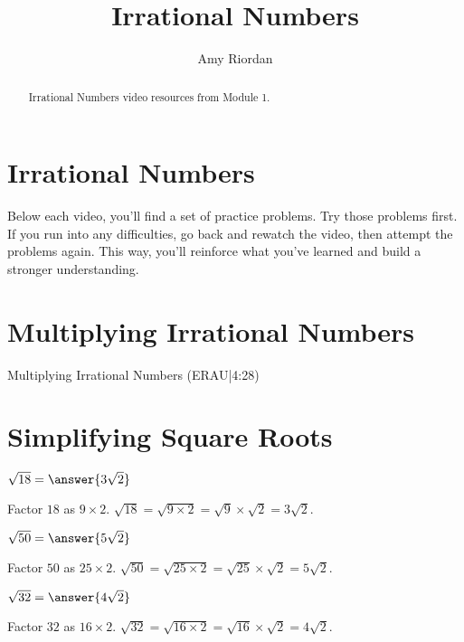 \documentclass{ximera}
\title{Irrational Numbers}
\author{Amy Riordan}
\begin{document}
\begin{abstract}
Irrational Numbers video resources from Module 1.
\end{abstract}
\maketitle

\section*{Irrational Numbers}

Below each video, you’ll find a set of practice problems. Try those problems first. If you run into any difficulties, go back and rewatch the video, then attempt the problems again. This way, you’ll reinforce what you’ve learned and build a stronger understanding.

\section*{Multiplying Irrational Numbers}

Multiplying Irrational Numbers (ERAU|4:28)



\section*{Simplifying Square Roots}

\begin{problem}
$\sqrt{18} = \answer{3\sqrt{2}}$

\begin{feedback}
Factor $18$ as $9 \times 2$. $\sqrt{18} = \sqrt{9 \times 2} = \sqrt{9} \times \sqrt{2} = 3\sqrt{2}$.
\end{feedback}
\end{problem}

\begin{problem}
$\sqrt{50} = \answer{5\sqrt{2}}$

\begin{feedback}
Factor $50$ as $25 \times 2$. $\sqrt{50} = \sqrt{25 \times 2} = \sqrt{25} \times \sqrt{2} = 5\sqrt{2}$.
\end{feedback}
\end{problem}

\begin{problem}
$\sqrt{32} = \answer{4\sqrt{2}}$

\begin{feedback}
Factor $32$ as $16 \times 2$. $\sqrt{32} = \sqrt{16 \times 2} = \sqrt{16} \times \sqrt{2} = 4\sqrt{2}$.
\end{feedback}
\end{problem}
\end{document}
